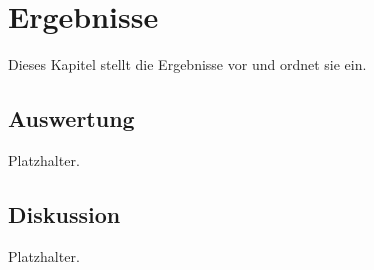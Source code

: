 
\chapter{Ergebnisse}\label{ch:ergebnisse}

Dieses Kapitel stellt die Ergebnisse vor und ordnet sie ein.

\section{Auswertung}\label{sec:auswertung}

Platzhalter.

\section{Diskussion}\label{sec:diskussion}

Platzhalter.
